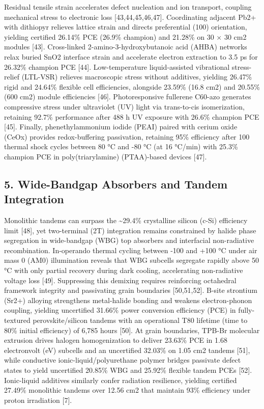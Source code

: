 \documentclass[
  11pt,
]{article}
\begin{document}
Residual tensile strain accelerates defect nucleation and ion transport,
coupling mechanical stress to electronic loss {[}43,44,45,46,47{]}.
Coordinating adjacent Pb2+ with dithiopyr relieves lattice strain and
directs preferential (100) orientation, yielding certified 26.14\% PCE
(26.9\% champion) and 21.28\% on 30 × 30 cm2 modules {[}43{]}.
Cross-linked 2-amino-3-hydroxybutanoic acid (AHBA) networks relax buried
SnO2 interface strain and accelerate electron extraction to 3.5 ps for
26.32\% champion PCE {[}44{]}. Low-temperature liquid-assisted
vibrational stress-relief (LTL-VSR) relieves macroscopic stress without
additives, yielding 26.47\% rigid and 24.64\% flexible cell
efficiencies, alongside 23.59\% (16.8 cm2) and 20.55\% (600 cm2) module
efficiencies {[}46{]}. Photoresponsive fullerene C60-azo generates
compressive stress under ultraviolet (UV) light via trans-to-cis
isomerization, retaining 92.7\% performance after 488 h UV exposure with
26.6\% champion PCE {[}45{]}. Finally, phenethylammonium iodide (PEAI)
paired with cerium oxide (CeOx) provides redox-buffering passivation,
retaining 95\% efficiency after 100 thermal shock cycles between 80 °C
and -80 °C (at 16 °C/min) with 25.3\% champion PCE in poly(triarylamine)
(PTAA)-based devices {[}47{]}.

\subsection{5. Wide-Bandgap Absorbers and Tandem
Integration}\label{wide-bandgap-absorbers-and-tandem-integration}

Monolithic tandems can surpass the \textasciitilde29.4\% crystalline
silicon (c-Si) efficiency limit {[}48{]}, yet two-terminal (2T)
integration remains constrained by halide phase segregation in
wide-bandgap (WBG) top absorbers and interfacial non-radiative
recombination. In-operando thermal cycling between -100 and +100 °C
under air mass 0 (AM0) illumination reveals that WBG subcells segregate
rapidly above 50 °C with only partial recovery during dark cooling,
accelerating non-radiative voltage loss {[}49{]}. Suppressing this
demixing requires reinforcing octahedral framework integrity and
passivating grain boundaries {[}50,51,52{]}. B-site strontium (Sr2+)
alloying strengthens metal-halide bonding and weakens electron-phonon
coupling, yielding uncertified 31.66\% power conversion efficiency (PCE)
in fully-textured perovskite/silicon tandems with an operational T80
lifetime (time to 80\% initial efficiency) of 6,785 hours {[}50{]}. At
grain boundaries, TPB-Br molecular extrusion drives halogen
homogenization to deliver 23.63\% PCE in 1.68 electronvolt (eV) subcells
and an uncertified 32.03\% on 1.05 cm2 tandems {[}51{]}, while
conductive ionic-liquid/polyurethane polymer bridges passivate defect
states to yield uncertified 20.85\% WBG and 25.92\% flexible tandem PCEs
{[}52{]}. Ionic-liquid additives similarly confer radiation resilience,
yielding certified 27.49\% monolithic tandems over 12.56 cm2 that
maintain 93\% efficiency under proton irradiation {[}7{]}.
\end{document}
